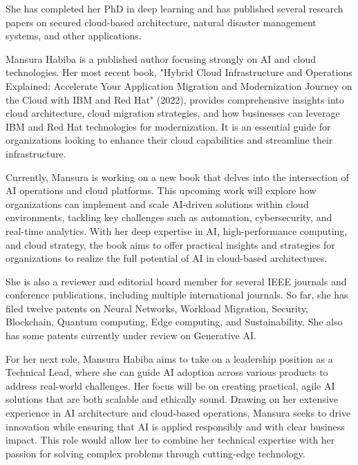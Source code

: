 \documentclass[12pt,]{scrartcl}
\begin{document}
She has completed her PhD in deep learning and has published several research papers on secured cloud-based architecture, natural disaster management systems, and other applications. 

Mansura Habiba is a published author focusing strongly on AI and cloud technologies. Her most recent book, "Hybrid Cloud Infrastructure and Operations Explained: Accelerate Your Application Migration and Modernization Journey on the Cloud with IBM and Red Hat" (2022), provides comprehensive insights into cloud architecture, cloud migration strategies, and how businesses can leverage IBM and Red Hat technologies for modernization. It is an essential guide for organizations looking to enhance their cloud capabilities and streamline their infrastructure.

Currently, Mansura is working on a new book that delves into the intersection of AI operations and cloud platforms. This upcoming work will explore how organizations can implement and scale AI-driven solutions within cloud environments, tackling key challenges such as automation, cybersecurity, and real-time analytics. With her deep expertise in AI, high-performance computing, and cloud strategy, the book aims to offer practical insights and strategies for organizations to realize the full potential of AI in cloud-based architectures.

She is also a reviewer and editorial board member for several IEEE journals and conference publications, including multiple international journals. So far, she has filed twelve patents on Neural Networks, Workload Migration, Security, Blockchain, Quantum computing, Edge computing, and Sustainability. She also has some patents currently under review on Generative AI. 

For her next role, Mansura Habiba aims to take on a leadership position as a Technical Lead, where she can guide AI adoption across various products to address real-world challenges. Her focus will be on creating practical, agile AI solutions that are both scalable and ethically sound. Drawing on her extensive experience in AI architecture and cloud-based operations, Mansura seeks to drive innovation while ensuring that AI is applied responsibly and with clear business impact. This role would allow her to combine her technical expertise with her passion for solving complex problems through cutting-edge technology.

\vspace{0.3cm}
\end{document}
